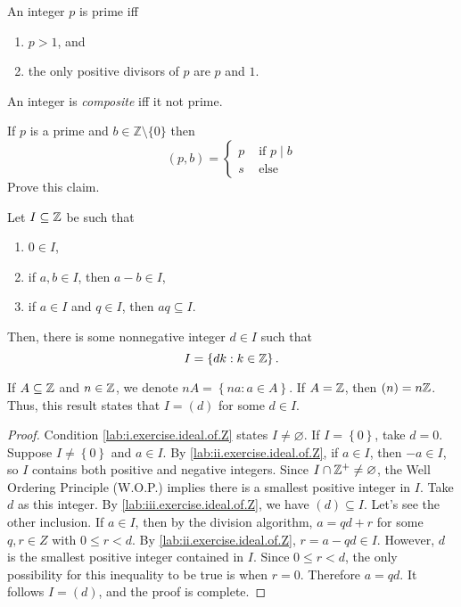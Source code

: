 \documentclass[11pt,a4paper]{article}
\begin{document}
\begin{defi}
    An integer \(p\) is prime iff 
    \begin{enumerate}[label=(\roman*)]
        \item \(p>1\), and
        \item the only positive divisors of \(p\) are \(p\) and \(1\).
    \end{enumerate}
    An integer is \textit{composite} iff it not prime.
\end{defi}


\begin{rem}
    If $p$ is a prime and $b \in \mathbb{Z}\setminus \{0\}$ then
\[
(p, b)= \begin{cases}p & \text { if } p \mid b \\ s & \text { else }\end{cases}
\]
Prove this claim.
\end{rem}

\begin{prop}
    Let \(I\subseteq \mathbb{Z}\) be such that 
    \begin{enumerate}[label=(\roman*)]
        \item\label{lab:i.exercise.ideal.of.Z} \(0\in I\),
        \item\label{lab:ii.exercise.ideal.of.Z} if  \(a,b\in I\), then \(a-b\in I\), 
        \item\label{lab:iii.exercise.ideal.of.Z} if \(a\in I\) and \(q\in I\), then  \(aq\subseteq I\).
    \end{enumerate}
    Then, there is some nonnegative integer \(d\in I\) such that  \[I = \left\{ dk: k \in \mathbb{Z} \right\}.\]
\end{prop}

\begin{rem}
    If \(A\subseteq \mathbb{Z}\) and \(n\in \mathbb{Z}\), we denote 
    \(nA = \left\{n a : a\in A \right\}\).
    If \(A=\mathbb{Z}\), then \((n) = n\mathbb{Z}\).
    Thus, this result states that \(I=(d)\) for some \(d\in I\).
\end{rem}

\begin{proof}
    Condition \ref{lab:i.exercise.ideal.of.Z} states \(I\neq \varnothing\).
   If \(I = \left\{ 0 \right\}\), take \(d=0\).
   Suppose \(I\neq \left\{ 0 \right\}\)  and \(a\in I\). 
   By \ref{lab:ii.exercise.ideal.of.Z}, 
   if \(a\in I\), then \(-a\in I\), so \(I\) contains both positive and negative integers.
   Since \(I\cap \mathbb{Z}^+\neq \varnothing\), the Well Ordering Principle (W.O.P.) implies there is a smallest positive integer in \(I\).
    Take \(d\) as this  integer.
    By \ref{lab:iii.exercise.ideal.of.Z}, we have \((d)\subseteq I\).
    Let's see the other inclusion.
    If \(a\in I\), then by the division algorithm, \(a=qd+r\) for some \(q,r\in Z\) with \(0\leq r < d\).
    By \ref{lab:ii.exercise.ideal.of.Z}, \(r=a-qd\in I\).
    However, \(d\)  is the smallest positive integer contained in \(I\).
    Since \(0\leq r <d\), the only possibility for this inequality to be true is when  \(r=0\).
    Therefore \(a=qd\).
    It follows \(I =  (d)\), and the proof is complete.
\end{proof}
\end{document}
